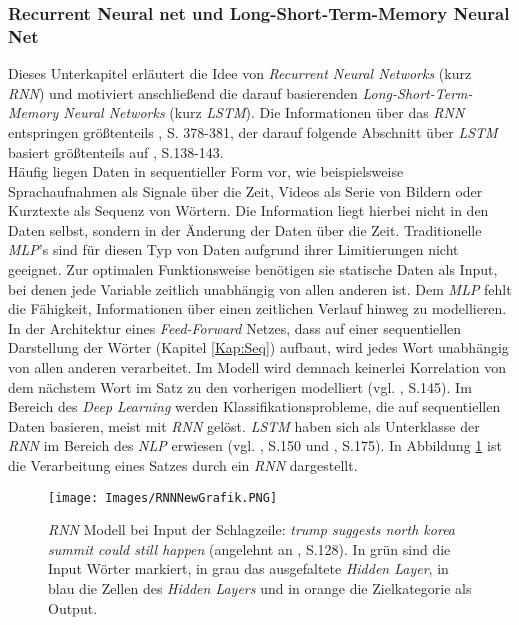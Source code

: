 \documentclass[a4paper,11pt]{article}
\begin{document}
\subsubsection{Recurrent Neural net und Long-Short-Term-Memory Neural Net} \label{kap:LSTM}

Dieses Unterkapitel erläutert die Idee von \textit{Recurrent Neural Networks} (kurz \textit{RNN}) und motiviert anschließend die darauf basierenden \textit{Long-Short-Term-Memory Neural Networks} (kurz \textit{LSTM}). Die Informationen über das \textit{RNN} entspringen größtenteils \cite{deepL}, S. 378-381, der darauf folgende Abschnitt über \textit{LSTM} basiert größtenteils auf \cite{deepNLP}, S.138-143.\\

Häufig liegen Daten in sequentieller Form vor, wie beispielsweise Sprachaufnahmen als Signale über die Zeit, Videos als Serie von Bildern oder Kurztexte als Sequenz von Wörtern. Die Information liegt hierbei nicht in den Daten selbst, sondern in der Änderung der Daten über die Zeit. Traditionelle \textit{MLP}'s sind für diesen Typ von Daten aufgrund ihrer Limitierungen nicht geeignet. Zur optimalen Funktionsweise benötigen sie statische Daten als Input, bei denen jede Variable zeitlich unabhängig von allen anderen ist. Dem \textit{MLP} fehlt die Fähigkeit, Informationen über einen zeitlichen Verlauf hinweg zu modellieren. In der Architektur eines \textit{Feed-Forward} Netzes, dass auf einer sequentiellen Darstellung der Wörter (Kapitel \ref{Kap:Seq}) aufbaut, wird jedes Wort unabhängig von allen anderen verarbeitet. Im Modell wird demnach keinerlei Korrelation von dem nächstem Wort im Satz zu den vorherigen modelliert (vgl. \cite{deepEssentials}, S.145). Im Bereich des \textit{Deep Learning} werden Klassifikationsprobleme, die auf sequentiellen Daten basieren, meist mit \textit{RNN} gelöst. \textit{LSTM} haben sich als Unterklasse der \textit{RNN} im Bereich des \textit{NLP} erwiesen (vgl. \cite{deepEssentials}, S.150 und \cite{keras}, S.175). In Abbildung \ref{abb:RNNExample} ist die Verarbeitung eines Satzes durch ein \textit{RNN} dargestellt.

\begin{figure}[!ht]
\begin{center}
\texttt{[image: Images/RNNNewGrafik.PNG]}
\caption{\textit{RNN} Modell bei Input der Schlagzeile: \textit{trump suggests north korea summit could still happen} (angelehnt an \cite{deepNLP}, S.128). In grün sind die Input Wörter markiert, in grau das ausgefaltete \textit{Hidden Layer}, in blau die Zellen des \textit{Hidden Layers} und in orange die Zielkategorie als Output.}
\label{abb:RNNExample}
\end{center}
\end{figure}
\end{document}

